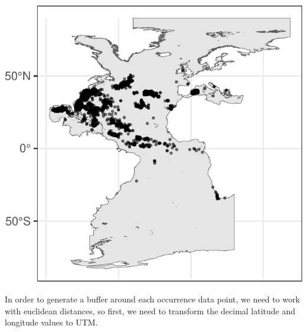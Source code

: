 \documentclass[
]{book}
\newenvironment{Shaded}{\begin{snugshade}}{\end{snugshade}}
\newcommand{\CommentTok}[1]{\textcolor[rgb]{0.56,0.35,0.01}{\textit{#1}}}
\newcommand{\ControlFlowTok}[1]{\textcolor[rgb]{0.13,0.29,0.53}{\textbf{#1}}}
\newcommand{\DecValTok}[1]{\textcolor[rgb]{0.00,0.00,0.81}{#1}}
\newcommand{\FunctionTok}[1]{\textcolor[rgb]{0.13,0.29,0.53}{\textbf{#1}}}
\newcommand{\NormalTok}[1]{#1}
\newcommand{\OtherTok}[1]{\textcolor[rgb]{0.56,0.35,0.01}{#1}}
\newcommand{\SpecialCharTok}[1]{\textcolor[rgb]{0.81,0.36,0.00}{\textbf{#1}}}
\begin{document}
\includegraphics{_main_files/figure-latex/unnamed-chunk-18-1.pdf}

In order to generate a buffer around each occurrence data point, we need to work with euclidean distances, so first, we need to transform the decimal latitude and longitude values to UTM.

\begin{Shaded}
\end{Shaded}
\end{document}
